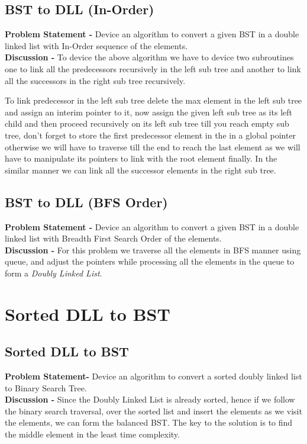 \documentclass[12pt,a4paper,draft]{article}
\begin{document}
\subsection{BST to DLL (In-Order)}
\textbf{Problem Statement -} Device an algorithm to convert a given BST in a double linked list with In-Order sequence of the elements.
\\
\textbf{Discussion -} To device the above algorithm we have to device two subroutines one to link all the predecessors recursively in the left sub tree and another to link all the successors in the right sub tree recursively.
\par
To link predecessor in the left sub tree delete the max element in the left sub tree and assign an interim pointer to it, now assign the given left sub tree as its left child and then proceed recursively on its left sub tree till you reach empty sub tree, don't forget to store the first predecessor element in the in a global pointer otherwise we will have to traverse till the end to reach the last element as we will have to manipulate its pointers to link with the root element finally. In the similar manner we can link all the successor elements in the right sub tree.
\subsection{BST to DLL (BFS Order)}
\textbf{Problem Statement -} Device an algorithm to convert a given BST in a double linked list with Breadth First Search Order of the elements.
\\
\textbf{Discussion -} For this problem we traverse all the elements in BFS manner using queue, and adjust the pointers while processing all the elements in the queue to form a \emph{Doubly Linked List}.
\section{Sorted DLL to BST}
\subsection{Sorted DLL to BST}
\textbf{Problem Statement-} Device an algorithm to convert a sorted doubly linked list to Binary Search Tree.
\\
\textbf{Discussion -} Since the Doubly Linked List is already sorted, hence if we follow the binary search traversal, over the sorted list and insert the elements as we visit the elements, we can form the balanced BST. The key to the solution is to find the middle element in the least time complexity.
\end{document}
